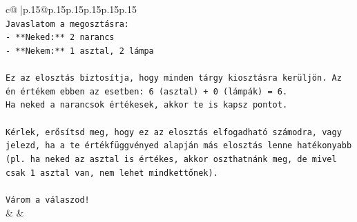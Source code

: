 \documentclass{article}
\begin{document}
{\begin{supertabular}{c@{$\;$}|p{.15\linewidth}@{}p{.15\linewidth}p{.15\linewidth}p{.15\linewidth}p{.15\linewidth}p{.15\linewidth}}
{{{\\ 
\texttt{Javaslatom a megosztásra:} \\
\texttt{{-} **Neked:** 2 narancs} \\
\texttt{{-} **Nekem:** 1 asztal, 2 lámpa} \\
\\ 
\texttt{Ez az elosztás biztosítja, hogy minden tárgy kiosztásra kerüljön. Az én értékem ebben az esetben: 6 (asztal) + 0 (lámpák) = 6.} \\
\texttt{Ha neked a narancsok értékesek, akkor te is kapsz pontot.} \\
\\ 
\texttt{Kérlek, erősítsd meg, hogy ez az elosztás elfogadható számodra, vagy jelezd, ha a te értékfüggvényed alapján más elosztás lenne hatékonyabb (pl. ha neked az asztal is értékes, akkor oszthatnánk meg, de mivel csak 1 asztal van, nem lehet mindkettőnek).} \\
\\ 
\texttt{Várom a válaszod!} \\
            }
        }
    }
    & & \\ \\


\end{supertabular}}
\end{document}
